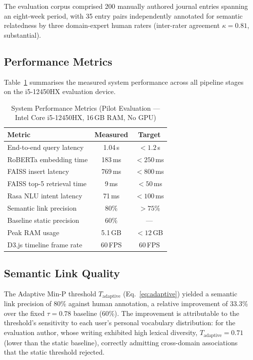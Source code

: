 \documentclass[12pt, letterpaper]{article}
\begin{document}
The evaluation corpus comprised 200 manually authored journal
entries spanning an eight-week period, with 35 entry pairs
independently annotated for semantic relatedness by three
domain-expert human raters (inter-rater agreement
$\kappa = 0.81$, substantial).

\subsection{Performance Metrics}

Table~\ref{tab:perf} summarises the measured system
performance across all pipeline stages on the i5-12450HX
evaluation device.

\begin{table}[htbp]
\centering
\caption{System Performance Metrics (Pilot Evaluation ---
Intel Core i5-12450HX, 16\,GB RAM, No GPU)}
\label{tab:perf}
\begin{tabular}{lcc}
\toprule
\textbf{Metric}              & \textbf{Measured} & \textbf{Target} \\
\midrule
End-to-end query latency     & 1.04\,s           & $<1.2$\,s \\
RoBERTa embedding time       & 183\,ms           & $<250$\,ms \\
FAISS insert latency         & 769\,ms           & $<800$\,ms \\
FAISS top-5 retrieval time   & 9\,ms             & $<50$\,ms \\
Rasa NLU intent latency      & 71\,ms            & $<100$\,ms \\
Semantic link precision      & 80\%              & $>75\%$ \\
Baseline static precision    & 60\%              & --- \\
Peak RAM usage               & 5.1\,GB           & $<12$\,GB \\
D3.js timeline frame rate    & 60\,FPS           & 60\,FPS \\
\bottomrule
\end{tabular}
\end{table}

\subsection{Semantic Link Quality}

The Adaptive Min-P threshold $T_{\mathrm{adaptive}}$
(Eq.~\ref{eq:adaptive}) yielded a semantic link precision of
80\% against human annotation, a relative improvement of
33.3\% over the fixed $\tau = 0.78$ baseline (60\%).
The improvement is attributable to the threshold's sensitivity
to each user's personal vocabulary distribution: for the
evaluation author, whose writing exhibited high lexical
diversity, $T_{\mathrm{adaptive}} = 0.71$ (lower than the
static baseline), correctly admitting cross-domain
associations that the static threshold rejected.
\end{document}

